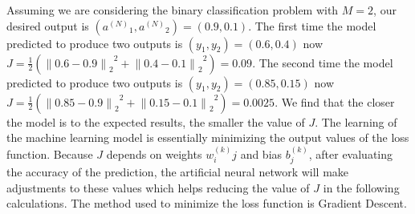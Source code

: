 \documentclass[conference]{IEEEtran}
\begin{document}
Assuming we are considering the binary classification problem with $M=2$, our desired output is $ \left( {a ^ {(N)}} _ 1, {a ^ {(N)}} _2 \right)=(0.9,0.1) $. The first time the model predicted to produce two outputs is $ (y_1, y_2)=(0.6,0.4) $ now $ J = \frac {1} {2} \left({{{\parallel} 0.6 - 0.9 {\parallel}} _ 2} ^ 2 + {{{\parallel} 0.4 - 0.1 {\parallel}} _ 2} ^ 2 \right) = 0.09 $. The second time the model predicted to produce two outputs is $ (y_1, y_2) = (0.85,0.15) $ now $ J = \frac {1} {2} \left({{{\parallel} 0.85 - 0.9 {\parallel}} _ 2} ^ 2 + {{{\parallel} 0.15 - 0.1 {\parallel}} _ 2} ^ 2 \right) = 0.0025 $. We find that the closer the model is to the expected results, the smaller the value of $ J $. The learning of the machine learning model is essentially minimizing the output values of the loss function. Because $ J $ depends on weights $ w ^ {(k)} _ ij $ and bias $ b ^ {(k)} _ j $, after evaluating the accuracy of the prediction, the artificial neural network  will make adjustments to these values which helps reducing the value of $ J $ in the following calculations. The method used to minimize the loss function is Gradient Descent.
\end{document}
